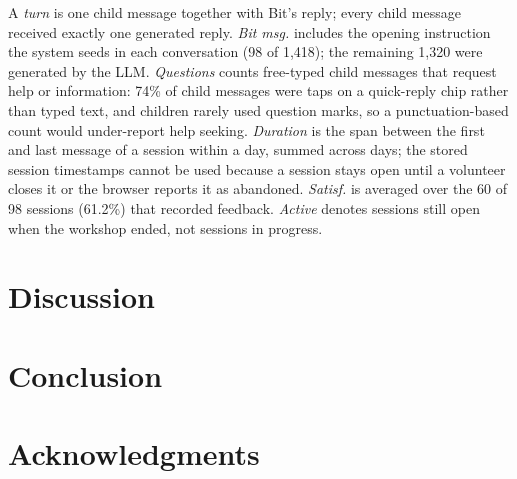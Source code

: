 \documentclass[fleqn,10pt]{JLA_article} %
\begin{document}
A \emph{turn} is one child message together with Bit's reply; every child
message received exactly one generated reply. \emph{Bit msg.} includes the
opening instruction the system seeds in each conversation (98 of 1,418);
the remaining 1,320 were generated by the LLM. \emph{Questions} counts
free-typed child messages that request help or information: 74\% of child
messages were taps on a quick-reply chip rather than typed text, and children
rarely used question marks, so a punctuation-based count would under-report
help seeking. \emph{Duration} is the span between the first and last message
of a session within a day, summed across days; the stored session timestamps
cannot be used because a session stays open until a volunteer closes it or
the browser reports it as abandoned. \emph{Satisf.} is averaged over the 60
of 98 sessions (61.2\%) that recorded feedback. \emph{Active} denotes
sessions still open when the workshop ended, not sessions in progress.
\section{Discussion}

\section{Conclusion}
\section*{Acknowledgments} %


\printbibliography 

\end{document}
